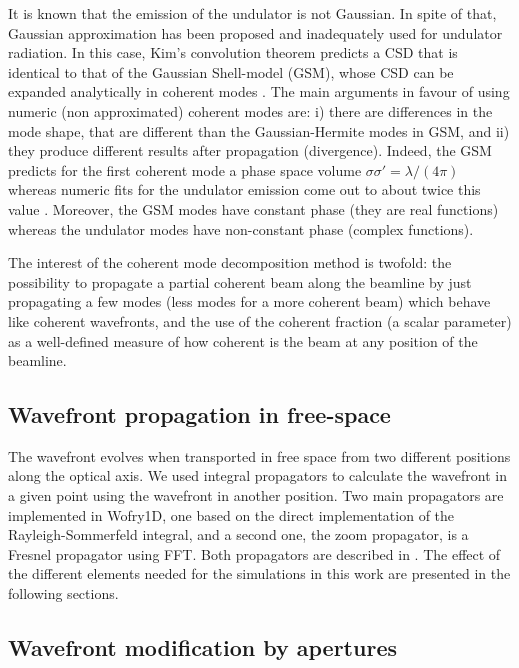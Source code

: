 \documentclass{iucr}              %
\begin{document}
It is known that the emission of the undulator is not Gaussian. In spite of that, Gaussian approximation has been proposed \cite{coisson1997} and inadequately used for undulator radiation. In this case, Kim's convolution theorem predicts a CSD that is identical to that of the Gaussian Shell-model (GSM), whose CSD can be expanded analytically in coherent modes \cite{Starikov82}. The main arguments in favour of using numeric (non approximated) coherent modes are: i) there are differences in the mode shape, that are different than the Gaussian-Hermite modes in GSM, and ii) they produce different results after propagation (divergence). Indeed, the GSM predicts for the first coherent mode a phase space volume $\sigma \sigma'=\lambda/(4 \pi)$ whereas numeric fits for the undulator emission come out to about twice this value \cite{elleaume}. Moreover, the GSM modes have constant phase (they are real functions) whereas the undulator modes have non-constant phase (complex functions).

The interest of the coherent mode decomposition method is twofold: the possibility to propagate a partial coherent beam along the beamline by just propagating a few modes (less modes for a more coherent beam) which behave like coherent wavefronts, and the use of the coherent fraction (a scalar parameter) as a well-defined measure of how coherent is the beam at any position of the beamline.

\subsection{Wavefront propagation in free-space}

The wavefront evolves when transported in free space from two different positions along the optical axis. We used integral propagators to calculate the wavefront in a given point using the wavefront in another position. Two main propagators are implemented in Wofry1D, one based on the direct implementation of the  Rayleigh-Sommerfeld integral, and a second one, the zoom propagator, is a Fresnel propagator using FFT. Both propagators are described in . The effect of the different elements needed for the simulations in this work are presented in the following sections. 

\subsection{Wavefront modification by apertures}
\end{document}
